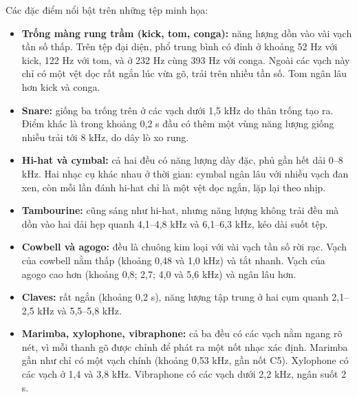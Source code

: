 \documentclass[11pt,a4paper]{article}
\begin{document}
Các đặc điểm nổi bật trên những tệp minh họa:
\begin{itemize}
\item \textbf{Trống màng rung trầm (kick, tom, conga):} năng lượng dồn vào vài vạch tần số thấp. Trên tệp đại diện, phổ trung bình có đỉnh ở khoảng 52 Hz với kick, 122 Hz với tom, và ở 232 Hz cùng 393 Hz với conga. Ngoài các vạch này chỉ có một vệt dọc rất ngắn lúc vừa gõ, trải trên nhiều tần số. Tom ngân lâu hơn kick và conga.
\item \textbf{Snare:} giống ba trống trên ở các vạch dưới 1,5 kHz do thân trống tạo ra. Điểm khác là trong khoảng 0,2 s đầu có thêm một vùng năng lượng giống nhiễu trải tới 8 kHz, do dây lò xo rung.
\item \textbf{Hi-hat và cymbal:} cả hai đều có năng lượng dày đặc, phủ gần hết dải 0--8 kHz. Hai nhạc cụ khác nhau ở thời gian: cymbal ngân lâu với nhiều vạch đan xen, còn mỗi lần đánh hi-hat chỉ là một vệt dọc ngắn, lặp lại theo nhịp.
\item \textbf{Tambourine:} cũng sáng như hi-hat, nhưng năng lượng không trải đều mà dồn vào hai dải hẹp quanh 4,1--4,8 kHz và 6,1--6,3 kHz, kéo dài suốt tệp.
\item \textbf{Cowbell và agogo:} đều là chuông kim loại với vài vạch tần số rời rạc. Vạch của cowbell nằm thấp (khoảng 0,48 và 1,0 kHz) và tắt nhanh. Vạch của agogo cao hơn (khoảng 0,8; 2,7; 4,0 và 5,6 kHz) và ngân lâu hơn.
\item \textbf{Claves:} rất ngắn (khoảng 0,2 s), năng lượng tập trung ở hai cụm quanh 2,1--2,5 kHz và 5,5--5,8 kHz.
\item \textbf{Marimba, xylophone, vibraphone:} cả ba đều có các vạch nằm ngang rõ nét, vì mỗi thanh gõ được chỉnh để phát ra một nốt nhạc xác định. Marimba gần như chỉ có một vạch chính (khoảng 0,53 kHz, gần nốt C5). Xylophone có các vạch ở 1,4 và 3,8 kHz. Vibraphone có các vạch dưới 2,2 kHz, ngân suốt 2 s.
\end{itemize}
\end{document}
